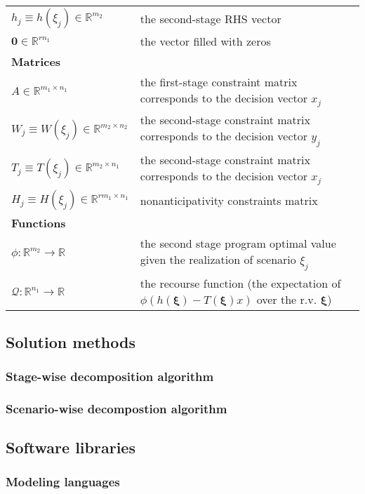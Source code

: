 \begin{table}[H]
{\begin{tabular}{ll}
			$h_j\equiv h(\xi_j)\in\mathbb{R}^{m_2}$	& the second-stage RHS vector\\
			$\mathbf{0}\in\mathbb{R}^{rn_1}$	& the vector filled with zeros \\ \midrule
			\textbf{Matrices} &  \\  \midrule
			$A\in\mathbb{R}^{m_1\times n_1}$	&	the first-stage constraint matrix corresponds to the decision vector $x_j$\\
			$W_j\equiv W(\xi_j)\in\mathbb{R}^{m_2\times n_2}$	&	the second-stage constraint matrix corresponds to the decision vector $y_j$\\
			$T_j\equiv T(\xi_j)\in\mathbb{R}^{m_2\times n_1}$	&	the second-stage constraint matrix corresponds to the decision vector $x_j$\\
			$H_j\equiv H(\xi_j)\in\mathbb{R}^{rm_1\times n_1}$	&	nonanticipativity constraints matrix \\ \midrule
			\textbf{Functions}	&	\\ \midrule
			$\phi:\mathbb{R}^{m_2}\to\mathbb{R}$	&	the second stage program optimal value given the realization of scenario $\xi_j$	\\
			$\mathcal{Q}:\mathbb{R}^{n_1}\to\mathbb{R}$	&	the recourse function (the expectation of $\phi\left( h(\pmb{\xi})-T(\pmb{\xi})x \right)$ over the r.v. $\pmb{\xi}$) 	\\
			\hline
		\end{tabular}
	}
\end{table} 


\subsection{Solution methods}
\subsubsection{Stage-wise decomposition algorithm}
\subsubsection{Scenario-wise decompostion algorithm}

\subsection{Software libraries}
\subsubsection{Modeling languages}
